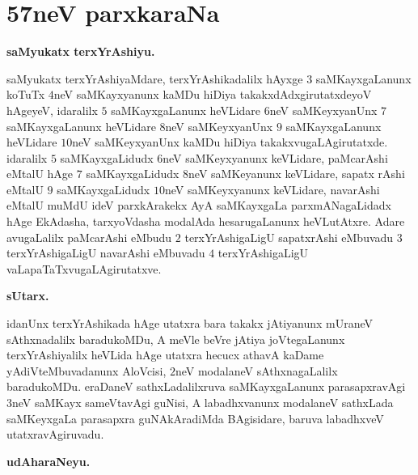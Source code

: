 \chapter{57neV parxkaraNa}

\begin{center}
{\bf saMyukatx terxYrAshiyu.}
\end{center}

saMyukatx terxYrAshiyaMdare, terxYrAshikadalilx hAyxge $3$ saMKayxgaLanunx koTuTx $4$neV saMKayxyanunx kaMDu hiDiya takakxdAdxgirutatxdeyoV hAgeyeV, idaralilx $5$ saMKayxgaLanunx heVLidare $6$neV saMKeyxyanUnx $7$ saMKayxgaLanunx heVLidare $8$neV saMKeyxyanUnx $9$ saMKayxgaLanunx heVLidare $10$neV saMKeyxyanUnx kaMDu hiDiya takakxvugaLAgirutatxde. idaralilx $5$ saMKayxgaLidudx $6$neV saMKeyxyanunx keVLidare, paMcarAshi eMtalU hAge $7$ saMKayxgaLidudx $8$neV saMKeyanunx keVLidare, sapatx rAshi eMtalU $9$ saMKayxgaLidudx $10$neV saMKeyxyanunx keVLidare, navarAshi eMtalU muMdU ideV parxkArakekx AyA saMKayxgaLa  parxmANagaLidadx hAge EkAdasha, tarxyoVdasha modalAda hesarugaLanunx heVLutAtxre. Adare avugaLalilx paMcarAshi eMbudu $2$ terxYrAshigaLigU sapatxrAshi eMbuvadu $3$ terxYrAshigaLigU navarAshi eMbuvadu $4$ terxYrAshigaLigU vaLapaTaTxvugaLAgirutatxve.

\begin{center}
{\bf sUtarx.}
\end{center}

idanUnx terxYrAshikada hAge utatxra bara takakx jAtiyanunx mUraneV sAthxnadalilx baradukoMDu, A meVle beVre jAtiya joVtegaLanunx terxYrAshiyalilx heVLida hAge utatxra hecucx athavA kaDame yAdiVteMbuvadanunx AloVcisi, $2$neV modalaneV sAthxnagaLalilx baradukoMDu. eraDaneV sathxLadalilxruva saMKayxgaLanunx parasapxravAgi $3$neV saMKayx sameVtavAgi guNisi, A labadhxvanunx modalaneV sathxLada saMKeyxgaLa parasapxra guNAkAradiMda BAgisidare, baruva labadhxveV utatxravAgiruvadu.


\begin{center}
{\bf udAharaNeyu.}
\end{center}

